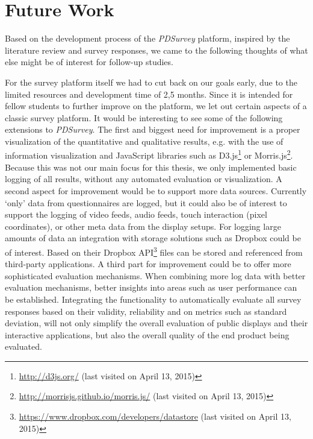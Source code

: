 \section{Future Work}
\label{chapter:future-work}
	
Based on the development process of the \textit{PDSurvey} platform, inspired by the literature review and survey responses, we came to the following thoughts of what else might be of interest for follow-up studies.


For the survey platform itself we had to cut back on our goals early, due to the limited resources and development time of 2,5 months. Since it is intended for fellow students to further improve on the platform, we let out certain aspects of a classic survey platform. It would be interesting to see some of the following extensions to \textit{PDSurvey}.
The first and biggest need for improvement is a proper visualization of the quantitative and qualitative results, e.g. with the use of information visualization and JavaScript libraries such as D3.js\footnote{\url{http://d3js.org/} (last visited on April 13, 2015)} or Morris.js\footnote{\url{http://morrisjs.github.io/morris.js/} (last visited on April 13, 2015)}. Because this was not our main focus for this thesis, we only implemented basic logging of all results, without any automated evaluation or visualization.
A second aspect for improvement would be to support more data sources. Currently `only' data from questionnaires are logged, but it could also be of interest to support the logging of video feeds, audio feeds, touch interaction (pixel coordinates), or other meta data from the display setups. For logging large amounts of data an integration with storage solutions such as Dropbox could be of interest. Based on their Dropbox API\footnote{\url{https://www.dropbox.com/developers/datastore} (last visited on April 13, 2015)} files can be stored and referenced from third-party applications.
A third part for improvement could be to offer more sophisticated evaluation mechanisms. When combining more log data with better evaluation mechanisms, better insights into areas such as user performance can be established. Integrating the functionality to automatically evaluate all survey responses based on their validity, reliability and on metrics such as standard deviation, will not only simplify the overall evaluation of public displays and their interactive applications, but also the overall quality of the end product being evaluated.






